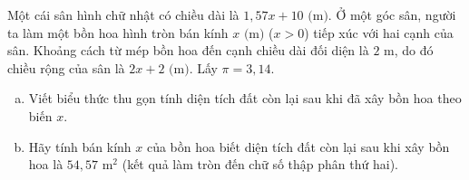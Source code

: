 \begin{bt}%
Một cái sân hình chữ nhật có chiều dài là $1{,}57x + 10\text{ (m)}$. Ở một góc sân, người ta làm một bồn hoa hình tròn bán kính $x\text{ (m)}$ ($x > 0$) tiếp xúc với hai cạnh của sân. Khoảng cách từ mép bồn hoa đến cạnh chiều dài đối diện là $2\text{ m}$, do đó chiều rộng của sân là $2x + 2\text{ (m)}$. Lấy $\pi = 3{,}14$.
	\begin{enumerate}[a)]
		\item Viết biểu thức thu gọn tính diện tích đất còn lại sau khi đã xây bồn hoa theo biến $x$.
		\item Hãy tính bán kính $x$ của bồn hoa biết diện tích đất còn lại sau khi xây bồn hoa là $54{,}57\text{ m}^2$ (kết quả làm tròn đến chữ số thập phân thứ hai).
	\end{enumerate}
\end{bt}



